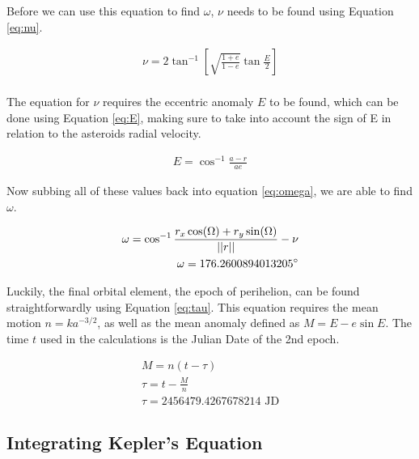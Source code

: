 \documentclass{article}
\begin{document}
\noindent
Before we can use this equation to find $\omega$, $\nu$ needs to be found using Equation \ref{eq:nu}.

\begin{equation}
    \label{eq:nu}
    \begin{aligned}
        \nu = 2\tan^{-1}[\sqrt{\frac{1+e}{1-e}}\tan\frac{E}{2}]\\
    \end{aligned}
\end{equation}

\noindent
The equation for $\nu$ requires the eccentric anomaly $E$ to be found, which can be done using Equation \ref{eq:E}, making sure to take into account 
the sign of E in relation to the asteroids radial velocity.

\begin{equation}
    \label{eq:E}
    \begin{aligned}
        E = \cos^{-1}\frac{a-r}{ae}
    \end{aligned}
\end{equation}

\noindent
Now subbing all of these values back into equation \ref{eq:omega}, we are able to find $\omega$.

\begin{equation}
    \label{eq:omega}
    \begin{aligned}
        \omega = \cos^{-1}\frac{r_x\cos(\Omega) + r_y\sin(\Omega)}{||r||} - \nu  \\ 
        \omega = 176.2600894013205 \degree
    \end{aligned}
\end{equation}

\noindent 
Luckily, the final orbital element, the epoch of perihelion, can be found straightforwardly using Equation \ref{eq:tau}. This equation requires the mean motion $n=ka^{-3/2}$, as well 
as the mean anomaly defined as $M = E - e\sin E$. The time $t$ used in the calculations is the Julian Date of the 2nd epoch.

\begin{equation}
    \label{eq:tau}
    \begin{aligned}
        M = n(t - \tau) \\
        \tau = t - \frac{M}{n} \\
        \tau = 2456479.4267678214 \text{ JD}
    \end{aligned}
\end{equation}

\subsection{Integrating Kepler's Equation}
\end{document}
